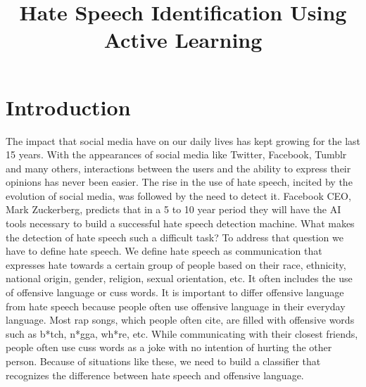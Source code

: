 \documentclass[10pt, a4paper]{article}
\title{Hate Speech Identification Using Active Learning}
\begin{document}
\maketitleabstract

\section{Introduction}
\begin{table}[t!]
	\centering
	\caption{First row shows the original tweet post from dataset, the second row shows cleaned, tokenized and steammed tweet post}
	\label{tbl:prepData}
\end{table}

The impact that social media have on our daily lives has kept growing for the last 15 years. With the appearances of social media like Twitter, Facebook, Tumblr and many others, interactions between the users and the ability to express their opinions has never been easier. The rise in the use of hate speech, incited by the evolution of social media, was followed by the need to detect it. Facebook CEO, Mark Zuckerberg, predicts that in a 5 to 10 year period they will have the AI tools necessary to build a successful hate speech detection machine. What makes the detection of hate speech such a difficult task? To address that question we have to define hate speech. We define hate speech as communication that expresses hate towards a certain group of people based on their race, ethnicity, national origin, gender, religion, sexual orientation, etc. It often includes the use of offensive language or cuss words. It is important to differ offensive language from hate speech because people often use offensive language in their everyday language. Most rap songs, which people often cite, are filled with offensive words such as b*tch, n*gga, wh*re, etc. While communicating with their closest friends, people often use cuss words as a joke with no intention of hurting the other person. Because of situations like these, we need to build a classifier that recognizes the difference between hate speech and offensive language. 
\end{document}
